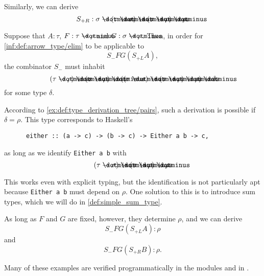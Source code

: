 \begin{example}
\begin{thmenum}
    Similarly, we can derive
    \begin{equation*}
      S_{+R}: \sigma \synimplies (\tau \synimplies \sigma) \synimplies (\sigma \synimplies \rho) \synimplies \rho.
    \end{equation*}

    Suppose that \( A: \tau \), \( F: \tau \synimplies \rho \) and \( G: \sigma \synimplies \rho \). Then, in order for \ref{inf:def:arrow_type/elim} to be applicable to
    \begin{equation*}
      S_- F G (S_{+L} A),
    \end{equation*}
    the combinator \( S_- \) must inhabit
    \begin{equation*}
      (\tau \synimplies \rho) \synimplies (\sigma \synimplies \rho) \synimplies ((\tau \synimplies \sigma) \synimplies (\sigma \synimplies \rho) \synimplies \rho) \synimplies \delta
    \end{equation*}
    for some type \( \delta \).

    According to \cref{ex:def:type_derivation_tree/pairs}, such a derivation is possible if \( \delta = \rho \). This type corresponds to Haskell's
    \begin{verbatim}
      either :: (a -> c) -> (b -> c) -> Either a b -> c,
    \end{verbatim}\vspace{-\baselineskip}
    as long as we identify \verb|Either a b| with
    \begin{equation*}
      (\tau \synimplies \sigma) \synimplies (\sigma \synimplies \rho) \synimplies \rho.
    \end{equation*}

    This works even with explicit typing, but the identification is not particularly apt because \verb|Either a b| must depend on \( \rho \). One solution to this is to introduce sum types, which we will do in \cref{def:simple_sum_type}.

    As long as \( F \) and \( G \) are fixed, however, they determine \( \rho \), and we can derive
    \begin{equation*}
      S_- F G (S_{+L} A): \rho
    \end{equation*}
    and
    \begin{equation*}
      S_- F G (S_{+R} B): \rho.
    \end{equation*}
  \end{thmenum}
\end{example}
\begin{comments}
  \item Many of these examples are verified programmatically in the modules  and  in \cite{notebook:code}.
\end{comments}

